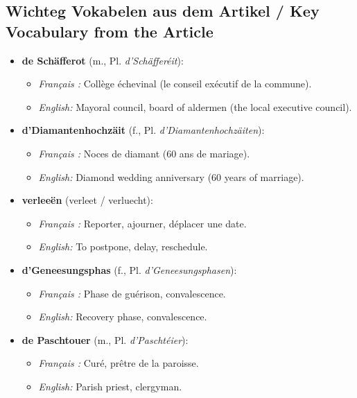 \vspace{1.5em}

\subsection*{Wichteg Vokabelen aus dem Artikel / Key Vocabulary from the Article}

\begin{itemize}
    \item \textbf{de Schäfferot} (m., Pl. \textit{d'Schäfferéit}):
    \begin{itemize}
        \item \textit{Français :} Collège échevinal (le conseil exécutif de la commune).
        \item \textit{English:} Mayoral council, board of aldermen (the local executive council).
    \end{itemize}

    \item \textbf{d'Diamantenhochzäit} (f., Pl. \textit{d'Diamantenhochzäiten}):
    \begin{itemize}
        \item \textit{Français :} Noces de diamant (60 ans de mariage).
        \item \textit{English:} Diamond wedding anniversary (60 years of marriage).
    \end{itemize}

    \item \textbf{verleeën} (verleet / verluecht):
    \begin{itemize}
        \item \textit{Français :} Reporter, ajourner, déplacer une date.
        \item \textit{English:} To postpone, delay, reschedule.
    \end{itemize}

    \item \textbf{d'Geneesungsphas} (f., Pl. \textit{d'Geneesungsphasen}):
    \begin{itemize}
        \item \textit{Français :} Phase de guérison, convalescence.
        \item \textit{English:} Recovery phase, convalescence.
    \end{itemize}

    \item \textbf{de Paschtouer} (m., Pl. \textit{d'Paschtéier}):
    \begin{itemize}
        \item \textit{Français :} Curé, prêtre de la paroisse.
        \item \textit{English:} Parish priest, clergyman.
    \end{itemize}


\end{itemize}

